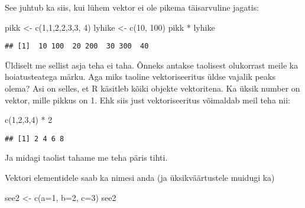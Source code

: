 \documentclass[
]{book}
\newenvironment{Shaded}{\begin{snugshade}}{\end{snugshade}}
\newcommand{\AttributeTok}[1]{\textcolor[rgb]{0.77,0.63,0.00}{#1}}
\newcommand{\DecValTok}[1]{\textcolor[rgb]{0.00,0.00,0.81}{#1}}
\newcommand{\FunctionTok}[1]{\textcolor[rgb]{0.00,0.00,0.00}{#1}}
\newcommand{\NormalTok}[1]{#1}
\newcommand{\OtherTok}[1]{\textcolor[rgb]{0.56,0.35,0.01}{#1}}
\newcommand{\SpecialCharTok}[1]{\textcolor[rgb]{0.00,0.00,0.00}{#1}}
\begin{document}
See juhtub ka siis, kui lühem vektor ei ole pikema täisarvuline jagatis:

\begin{Shaded}
\begin{Highlighting}[]
\NormalTok{pikk }\OtherTok{\textless{}{-}} \FunctionTok{c}\NormalTok{(}\DecValTok{1}\NormalTok{,}\DecValTok{1}\NormalTok{,}\DecValTok{2}\NormalTok{,}\DecValTok{2}\NormalTok{,}\DecValTok{3}\NormalTok{,}\DecValTok{3}\NormalTok{, }\DecValTok{4}\NormalTok{)}
\NormalTok{lyhike }\OtherTok{\textless{}{-}} \FunctionTok{c}\NormalTok{(}\DecValTok{10}\NormalTok{, }\DecValTok{100}\NormalTok{)}
\NormalTok{pikk }\SpecialCharTok{*}\NormalTok{ lyhike}
\end{Highlighting}
\end{Shaded}

\begin{verbatim}
## [1]  10 100  20 200  30 300  40
\end{verbatim}

Üldiselt me sellist asja teha ei taha. Õnneks antakse taolisest olukorrast meile ka hoiatusteatega märku. Aga miks taoline vektoriseeritus üldse vajalik peaks olema? Asi on selles, et R käsitleb kõiki objekte vektoritena. Ka üksik number on vektor, mille pikkus on 1. Ehk siis just vektoriseeritus võimaldab meil teha nii:

\begin{Shaded}
\begin{Highlighting}[]
\FunctionTok{c}\NormalTok{(}\DecValTok{1}\NormalTok{,}\DecValTok{2}\NormalTok{,}\DecValTok{3}\NormalTok{,}\DecValTok{4}\NormalTok{) }\SpecialCharTok{*} \DecValTok{2}
\end{Highlighting}
\end{Shaded}

\begin{verbatim}
## [1] 2 4 6 8
\end{verbatim}

Ja midagi taolist tahame me teha päris tihti.

Vektori elementidele saab ka nimesi anda (ja üksikväärtustele muidugi ka)

\begin{Shaded}
\begin{Highlighting}[]
\NormalTok{see2 }\OtherTok{\textless{}{-}} \FunctionTok{c}\NormalTok{(}\AttributeTok{a=}\DecValTok{1}\NormalTok{, }\AttributeTok{b=}\DecValTok{2}\NormalTok{, }\AttributeTok{c=}\DecValTok{3}\NormalTok{)}
\NormalTok{see2}
\end{Highlighting}
\end{Shaded}
\end{document}
